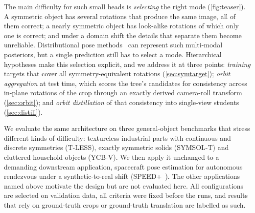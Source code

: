 The main difficulty for such small heads is \emph{selecting} the right mode (\cref{fig:teaser}). A symmetric object has several rotations that produce the same image, all of them correct; a nearly symmetric object has look-alike rotations of which only one is correct; and under a domain shift the details that separate them become unreliable. Distributional pose methods~\cite{murphy2021implicitpdf,haugaard2023spyropose,hsiao2024liepose} can represent such multi-modal posteriors, but a single prediction still has to select a mode. Hierarchical hypotheses make this selection explicit, and we address it at three points: \emph{training} targets that cover all symmetry-equivalent rotations (\cref{sec:symtarget}); \emph{orbit aggregation} at test time, which scores the tree's candidates for consistency across in-plane rotations of the crop through an exactly derived camera-roll transform (\cref{sec:orbit}); and \emph{orbit distillation} of that consistency into single-view students (\cref{sec:distill}).

We evaluate the same architecture on three general-object benchmarks that stress different kinds of difficulty: textureless industrial parts with continuous and discrete symmetries (T-LESS), exactly symmetric solids (SYMSOL-T) and cluttered household objects (YCB-V). We then apply it unchanged to a demanding downstream application, spacecraft pose estimation for autonomous rendezvous under a synthetic-to-real shift (SPEED+~\cite{park2022speedplus}). The other applications named above motivate the design but are not evaluated here. All configurations are selected on validation data, all criteria were fixed before the runs, and results that rely on ground-truth crops or ground-truth translation are labelled as such.

